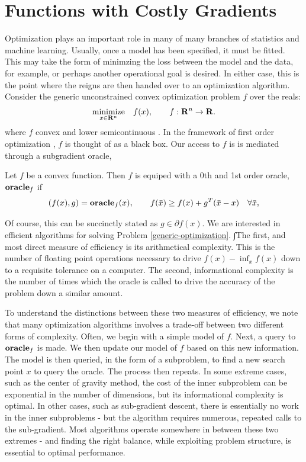 
\section{Functions with Costly Gradients} \label{introduction}

Optimization plays an important role in many of many branches of statistics
and machine learning. Usually, once a model has been specified, it must be
fitted. This may take the form of minimzing the loss between the model and the
data, for example, or perhaps another operational goal is desired. In either
case, this is the point where  the reigns are then handed over to an
optimization algorithm. Consider the generic unconstrained convex optimization
problem $f$ over the  reals:
\begin{equation} \label{generic-optimization}
  \underset{x\in \mathbf{R}^n}{\mbox{minimize}} \quad f(x), 
  \qquad f: \mathbf{R}^n \rightarrow \mathbf{R}.
\end{equation}
where $f$ convex and lower semicontinuous \cite[Definition~1.5]{RTRW:1998}. In
the framework of first order optimization \cite{nemirovski2005efficient}, $f$
is thought of as a black box. Our access to $f$ is is mediated through a
subgradient oracle,

\begin{defn} \label{dfn:exact-subgradient-oracle}
Let $f$ be a convex function. Then $f$ is equiped with a 0th and 1st order
oracle, $\mbox{\bf oracle}_f$ if
$$
(f(x), g) = \mbox{\bf oracle}_f(x), 
	\qquad f(\bar{x}) \geq f(x)+g^T(\bar{x}-x) 
	\quad \forall \bar{x},
$$
\end{defn}

Of course, this can be succinctly stated as $g\in \partial f(x)$. We are
interested in efficient algorithms for solving Problem \ref{generic-optimization}.
∫The first, and most direct measure of efficiency is its
arithmetical complexity. This is the number of floating point operations
necessary to drive $f(x) - \inf_x f(x)$ down to a requisite tolerance on a computer. The
second, informational complexity is the number of times which the oracle is
called to drive the accuracy of the problem down a similar amount.

To understand the distinctions between these two measures of efficiency, we
note that many optimization algorithms involves a trade-off between two
different forms  of complexity. Often, we begin with a simple model of $f$.
Next, a query to $\mbox{\bf oracle}_f$ is made. We then update our model of $f$
based on this new information. The model is then queried, in the form of a
subproblem, to find a new search point $x$ to query the oracle. The process
then repeats. In some extreme cases, such as the center of gravity
method\cite{levin1965algorithm}, the cost of the inner subproblem can be
exponential in the number of dimensions, but its informational complexity is
optimal. In other cases, such as sub-gradient descent, there is essentially no
work in the inner subproblems - but the algorithm requires numerous, repeated
calls to the sub-gradient. Most algorithms operate somewhere in between these
two extremes - and finding the right balance, while exploiting problem
structure, is essential to optimal performance.

